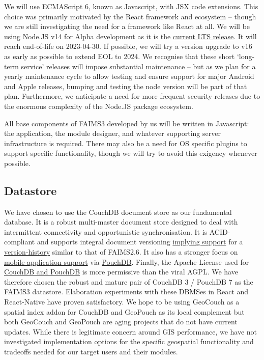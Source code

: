 \documentclass[a4paper,headings=small fontsize=10pt]{scrreprt}
\begin{document}
We will use ECMAScript 6, known as Javascript, with JSX code extensions.
This choice was primarily motivated by the React framework and ecosystem
-- though we are still investigating the need for a framework like
React at all. We will be using Node.JS v14 for Alpha development as it
is the \href{https://nodejs.org/en/about/releases/}{{current LTS
release}}. It will reach end-of-life on 2023-04-30. If possible, we will
try a version upgrade to v16 as early as possible to extend EOL to 2024.
We recognise that these short `long-term service' releases will impose
substantial maintenance -- but as we plan for a yearly maintenance
cycle to allow testing and ensure support for major Android and Apple
releases, bumping and testing the node version will be part of that
plan. Furthermore, we anticipate a need for more frequent security
releases due to the enormous complexity of the Node.JS package
ecosystem.

All base components of FAIMS3 developed by us will be written in
Javascript: the application, the module designer, and whatever
supporting server infrastructure is required. There may also be a need
for OS specific plugins to support specific functionality, though we
will try to avoid this exigency whenever possible.

\subsection{Datastore}

We have chosen to use the CouchDB document store as our fundamental
database. It is a robust multi-master document store designed to deal
with intermittent connectivity and opportunistic synchronisation. It is
ACID-compliant and supports integral document versioning
\href{https://docs.couchdb.org/en/stable/api/database/misc.html\#db-revs-diff}{{implying
support}} for a
\href{https://dba.stackexchange.com/a/248675}{{version-history}} similar
to that of FAIMS2.6. It also has a stronger focus on
\href{https://severalnines.com/database-blog/battle-nosql-databases-comparing-mongodb-and-couchdb}{{mobile
application support}} via \href{https://pouchdb.com/}{{PouchDB}}.
Finally, the Apache License used for
\href{https://db-engines.com/en/system/CouchDB\%3BMongoDB\%3BPouchDB}{{CouchDB
and PouchDB}} is more permissive than the viral AGPL. We have therefore
chosen the robust and mature pair of CouchDB 3 / PouchDB 7 as the FAIMS3
datastore. Elaboration experiments with these DBMSes in React and
React-Native have proven satisfactory. We hope to be using GeoCouch as a
spatial index addon for CouchDB and GeoPouch as its local complement but
both GeoCouch and GeoPouch are aging projects that do not have current
updates. While there is legitimate concern around GIS performance, we
have not investigated implementation options for the specific geospatial
functionality and tradeoffs needed for our target users and their
modules.
\end{document}
